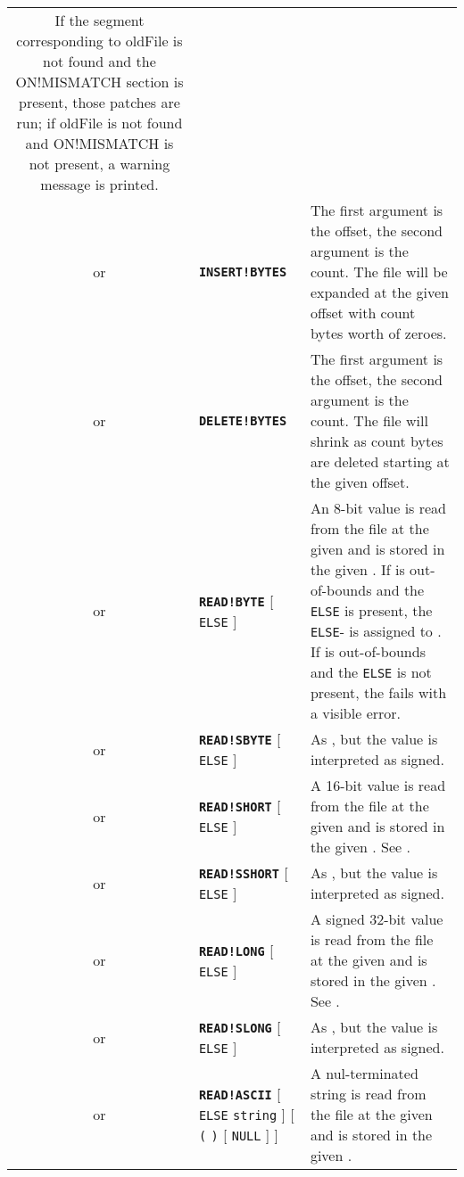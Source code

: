 \documentclass{article}
\def\ttref#1{\ahrefloc{#1}{\tt #1}}
\def\DEFINE#1{{\tt \bf #1}\label{#1}\index{#1}}
\def\t#1{{\tt #1}}
\def\Ob{{\color{red} [ }}
\def\Oe{{\color{red} ] }}
\begin{document}
\begin{tabular}{cp{10in}|p{10in}}
  If the segment corresponding to oldFile is not found and the ON!MISMATCH section
  is present, those patches are run; if oldFile is not found and ON!MISMATCH is not
  present, a warning message is printed.
  \\
or & \DEFINE{INSERT!BYTES} \ttref{offset} \ttref{value} &
  The first argument is the offset, the second argument is the count. 
  The file will be expanded at the given offset with count bytes worth of
  zeroes. \\
or & \DEFINE{DELETE!BYTES} \ttref{offset} \ttref{value} &
  The first argument is the offset, the second argument is the count. 
  The file will shrink as count bytes are deleted starting at the given
  offset. \\
or & \DEFINE{READ!BYTE} \ttref{offset} \ttref{variable} \Ob \t{ELSE}
\ttref{value} \Oe &
  An 8-bit value is read from the file at the given \ttref{offset} and is stored
  in the given \ttref{variable}. If \ttref{offset} is out-of-bounds and the
  \t{ELSE} is present, the \t{ELSE}-\ttref{value} is assigned to
  \ttref{variable}. If \ttref{offset} is out-of-bounds and the \t{ELSE} is
  not present, the \ttref{patch} fails with a visible error.  \\
or & \DEFINE{READ!SBYTE} \ttref{offset} \ttref{variable} \Ob \t{ELSE}
\ttref{value} \Oe &
  As \ttref{READ!BYTE}, but the value is interpreted as signed. \\
or & \DEFINE{READ!SHORT} \ttref{offset} \ttref{variable} \Ob \t{ELSE}
\ttref{value} \Oe &
  A 16-bit value is read from the file at the given \ttref{offset} and is
  stored in the given \ttref{variable}. See \ttref{READ!BYTE}. \\
or & \DEFINE{READ!SSHORT} \ttref{offset} \ttref{variable} \Ob \t{ELSE}
\ttref{value} \Oe &
  As \ttref{READ!SHORT}, but the value is interpreted as signed. \\
or & \DEFINE{READ!LONG} \ttref{offset} \ttref{variable} \Ob \t{ELSE}
\ttref{value} \Oe &
  A signed 32-bit value is read from the file at the given \ttref{offset}
  and is stored in the given \ttref{variable}. See \ttref{READ!BYTE}. \\
or & \DEFINE{READ!SLONG} \ttref{offset} \ttref{variable} \Ob \t{ELSE}
\ttref{value} \Oe &
  As \ttref{READ!SLONG}, but the value is interpreted as signed. \\
or & \DEFINE{READ!ASCII} \ttref{offset} \ttref{variable} \Ob \t{ELSE}
  \t{string} \Oe \Ob \t{(} \ttref{value} \t{)} \Ob \t{NULL} \Oe \Oe &
    A nul-terminated string is read from the file at
    the given \ttref{offset} and is stored in the given \ttref{variable}.

\end{tabular}
\end{document}
